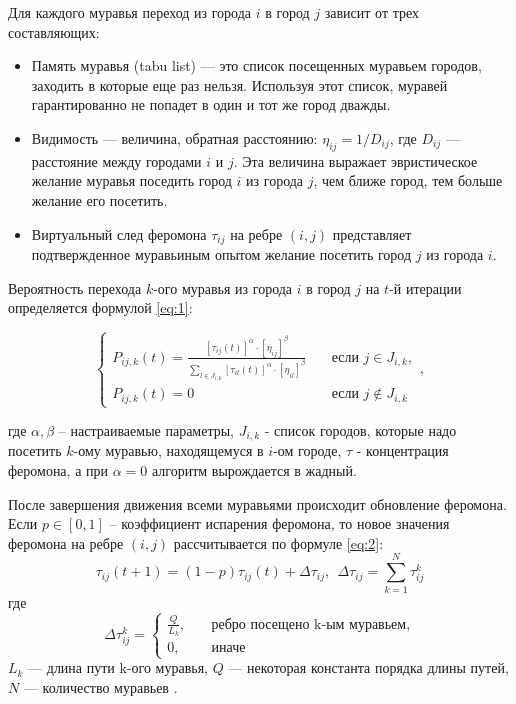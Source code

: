 Для каждого муравья переход из города $i$ в город $j$ зависит от трех
составляющих:
\begin{itemize}
    \item Память муравья (tabu list) — это список посещенных муравьем городов,
        заходить в которые еще раз нельзя. Используя этот список, муравей
        гарантированно не попадет в один и тот же город дважды.
    \item Видимость — величина, обратная расстоянию: $\eta_{ij} = 1 / D_{ij}$,
        где $D_{ij}$ — расстояние между городами $i$ и $j$. Эта величина
        выражает эвристическое желание муравья поседить город $i$ из города
        $j$, чем ближе город, тем больше желание его посетить.
    \item Виртуальный след феромона $\tau_{ij}$ на ребре $(i, j)$ представляет
        подтвержденное муравьиным опытом желание посетить город $j$ из города
        $i$.
\end{itemize}

Вероятность перехода $k$-ого муравья из города $i$ в город $j$ на $t$-й
итерации определяется формулой \ref{eq:1}:

\begin{equation}\label{eq:1}
      \begin{cases}
          P_{ij,k}(t) = \frac{[\tau_{ij}(t)]^{\alpha} \cdot
                        [\eta_{ij}]^{\beta}}{\displaystyle\sum_{l \in
                        J_{i,k}}[\tau_{il}(t)]^{\alpha} \cdot
                        [\eta_{il}]^{\beta}} & \quad \text{если } j \in
                        J_{i,k},\\
          P_{ij,k}(t) = 0 & \quad \text{если } j \notin J_{i,k}
      \end{cases}
      ,
\end{equation}

где $\alpha, \beta$ -- настраиваемые параметры, $J_{i,k}$ - список городов,
которые надо посетить $k$-ому муравью, находящемуся в $i$-ом городе, $\tau$ -
концентрация феромона, а при $\alpha = 0$ алгоритм вырождается в жадный.

После завершения движения всеми муравьями происходит обновление феромона.
Если $p \in [0, 1]$ -- коэффициент испарения феромона, то новое значения
феромона на ребре $(i,j)$ рассчитывается по формуле \ref{eq:2}:
\begin{equation}\label{eq:2}
    \tau_{ij}(t+1) = (1-p)\tau_{ij}(t) + \Delta \tau_{ij},~~\Delta \tau_{ij} =
                     \displaystyle\sum_{k=1}^N \tau^k_{ij}
\end{equation}
где
\begin{equation}\label{eq:3}
    \Delta \tau^k_{ij} = \begin{cases}
        \frac{Q}{L_k}, & \quad \textrm{ребро посещено k-ым муравьем,} \\
        0, & \quad \textrm{иначе}
    \end{cases}
\end{equation}
$L_{k}$ — длина пути k-ого муравья, $Q$ — некоторая константа порядка длины
путей, $N$ — количество муравьев \cite{Shtovba}.
 
